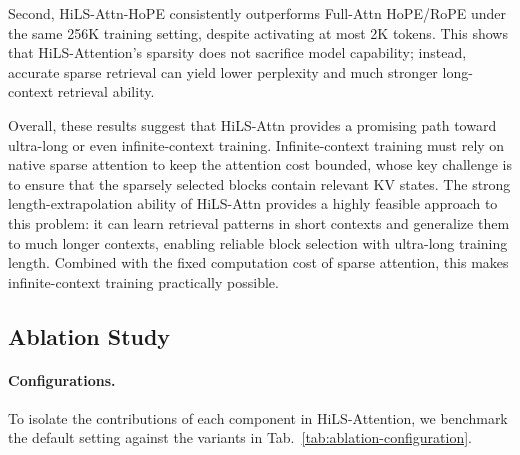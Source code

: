 Second, HiLS-Attn-HoPE consistently outperforms Full-Attn HoPE/RoPE under the same 256K training setting, despite activating at most 2K tokens. This shows that HiLS-Attention's sparsity does not sacrifice model capability; instead, accurate sparse retrieval can yield lower perplexity and much stronger long-context retrieval ability.

Overall, these results suggest that HiLS-Attn provides a promising path toward ultra-long or even infinite-context training. 
Infinite-context training must rely on native sparse attention to keep the attention cost bounded, whose key challenge is to ensure that the sparsely selected blocks contain relevant KV states. 
The strong length-extrapolation ability of HiLS-Attn provides a highly feasible approach to this problem: it can learn retrieval patterns in short contexts and generalize them to much longer contexts, enabling reliable block selection with ultra-long training length. 
Combined with the fixed computation cost of sparse attention, this makes infinite-context training practically possible.


\subsection{Ablation Study}

\paragraph{ Configurations.}
To isolate the contributions of each component in HiLS-Attention, we benchmark the default setting against the variants 
in Tab.~\ref{tab:ablation-configuration}.


